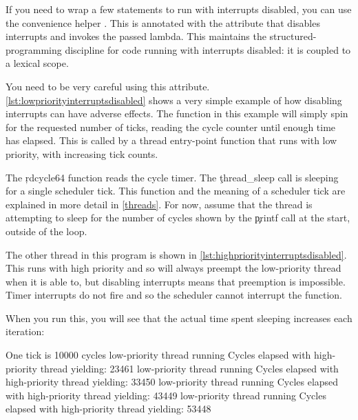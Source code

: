 {{If you need to wrap a few statements to run with interrupts disabled, you can use the convenience helper .
This is annotated with the attribute that disables interrupts and invokes the passed lambda.
This maintains the structured-programming discipline for code running with interrupts disabled: it is coupled to a lexical scope.


You need to be very careful using this attribute.
\ref{lst:lowpriorityinterruptsdisabled} shows a very simple example of how disabling interrupts can have adverse effects.
The  function in this example will simply spin for the requested number of ticks, reading the cycle counter until enough time has elapsed.
This is called by a thread entry-point function that runs with low priority, with increasing tick counts.

The \c{rdcycle64} function reads the cycle timer.
The \c{thread_sleep} call is sleeping for a single scheduler tick.
This function and the meaning of a scheduler tick are explained in more detail in \ref{threads}.
For now, assume that the thread is attempting to sleep for the number of cycles shown by the \c{printf} call at the start, outside of the loop.

\codelisting[filename=examples/interrupts_disabled/interrupts.cc,marker=low,label=lst:lowpriorityinterruptsdisabled,caption="A low-priority thread that uses an interrupts-disabled function to consume CPU."]{}

The other thread in this program is shown in \ref{lst:highpriorityinterruptsdisabled}.
This runs with high priority and so will always preempt the low-priority thread when it is able to, but disabling interrupts means that preemption is impossible.
Timer interrupts do not fire and so the scheduler cannot interrupt the function.

\codelisting[filename=examples/interrupts_disabled/interrupts.cc,marker=high,label=lst:highpriorityinterruptsdisabled,caption="A high-priority thread that is starved but an interrupts-disabled function called from a low-priority thread."]{}

When you run this, you will see that the actual time spent sleeping increases each iteration:

\begin{console}
One tick is 10000 cycles
low-priority thread running
Cycles elapsed with high-priority thread yielding: 23461
low-priority thread running
Cycles elapsed with high-priority thread yielding: 33450
low-priority thread running
Cycles elapsed with high-priority thread yielding: 43449
low-priority thread running
Cycles elapsed with high-priority thread yielding: 53448
\end{console}

}}
